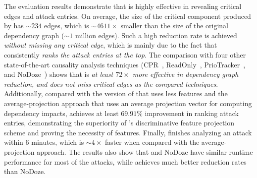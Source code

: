 The evaluation results demonstrate that \tool is highly effective in revealing critical edges and attack entries. On average, the size of the critical component produced by \tool has $\sim234$ edges, which is $\sim4611\times$ smaller than the size of the original dependency graph ($\sim1$ million edges). 
Such a high reduction rate is achieved \textit{without missing any critical edge}, which is mainly due to the fact that \tool consistently \textit{ranks the attack entries at the top}.
The comparison with four other state-of-the-art causality analysis techniques (CPR~\cite{reduction}, ReadOnly~\cite{loggc}, PrioTracker~\cite{liu2018priotracker}, and NoDoze~\cite{hassan2019nodoze}) shows that \tool is \textit{at least $72\times$ more effective in dependency graph reduction, and does not miss critical edges as the compared techniques}. 
Additionally, compared with the version of \tool that uses less features and the average-projection approach that uses an average projection vector for computing dependency impacts, \tool achieves at least $69.91\%$ improvement in ranking attack entries, demonstrating the superiority of \tool's discriminative feature projection scheme and proving the necessity of features.
Finally, \tool finishes analyzing an attack within $6$ minutes, which is $\sim4\times$ faster when compared with the average-projection approach.
The results also show that \tool and NoDoze have similar runtime performance for most of the attacks, while \tool achieves much better reduction rates than NoDoze.



% 
% 


